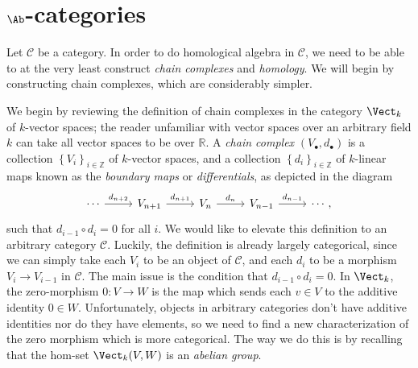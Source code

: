 \section{$\Ab $-categories}\label{sec2}

Let $\mathcal{C} $ be a category. In order to do homological algebra in $\mathcal{C} $, we need to be able to at the very least construct \emph{chain complexes} and \emph{homology}. We will begin by constructing chain complexes, which are considerably simpler.

We begin by reviewing the definition of chain complexes in the category $\Vect_k$ of $k$-vector spaces; the reader unfamiliar with vector spaces over an arbitrary field $k$ can take all vector spaces to be over $\mathbb{R} $. A \emph{chain complex} $(V_{\bullet} ,d_{\bullet} )$ is a collection $\left\{ V_i \right\}_{i\in\mathbb{Z} } $ of $k$-vector spaces, and a collection $\left\{ d_i \right\}_{i\in\mathbb{Z} } $ of $k$-linear maps known as the \emph{boundary maps} or \emph{differentials}, as depicted in the diagram
\[\begin{tikzcd}[row sep = 2.5em, column sep = 2.5em]
\cdots \ar[" d_{n+2}  ", r]  & V_{n+1} \ar[" d_{n+1}  ", r]  & V_n\ar[" d_n ", r]  & V_{n-1} \ar[" d_{n-1}  ", r]  & \cdots,
\end{tikzcd}\]
such that $d_{i-1} \circ d_i=0$ for all $i$. We would like to elevate this definition to an arbitrary category $\mathcal{C} $. Luckily, the definition is already largely categorical, since we can simply take each $V_i$ to be an object of $\mathcal{C} $, and each $d_i$ to be a morphism $V_i\to V_{i-1} $ in $\mathcal{C} $. The main issue is the condition that $d_{i-1} \circ d_i=0$. In $\Vect_k$, the zero-morphism $0 : V \to W$ is the map which sends each $v\in V$ to the additive identity $0\in W$. Unfortunately, objects in arbitrary categories don't have additive identities nor do they have elements, so we need to find a new characterization of the zero morphism which is more categorical. The way we do this is by recalling that the hom-set $\Vect_k(V,W)$ is an \emph{abelian group}.

